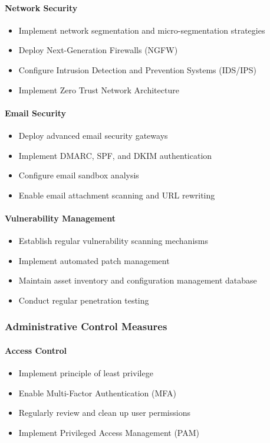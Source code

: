 \documentclass[12pt,a4paper]{article}
\begin{document}
\paragraph{Network Security}
\begin{itemize}
    \item Implement network segmentation and micro-segmentation strategies
    \item Deploy Next-Generation Firewalls (NGFW)
    \item Configure Intrusion Detection and Prevention Systems (IDS/IPS)
    \item Implement Zero Trust Network Architecture
\end{itemize}

\paragraph{Email Security}
\begin{itemize}
    \item Deploy advanced email security gateways
    \item Implement DMARC, SPF, and DKIM authentication
    \item Configure email sandbox analysis
    \item Enable email attachment scanning and URL rewriting
\end{itemize}

\paragraph{Vulnerability Management}
\begin{itemize}
    \item Establish regular vulnerability scanning mechanisms
    \item Implement automated patch management
    \item Maintain asset inventory and configuration management database
    \item Conduct regular penetration testing
\end{itemize}

\subsubsection{Administrative Control Measures}

\paragraph{Access Control}
\begin{itemize}
    \item Implement principle of least privilege
    \item Enable Multi-Factor Authentication (MFA)
    \item Regularly review and clean up user permissions
    \item Implement Privileged Access Management (PAM)
\end{itemize}
\end{document}
